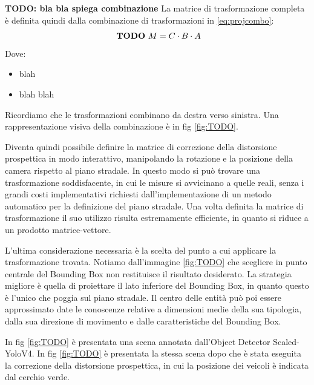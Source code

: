 \textbf{TODO: bla bla spiega combinazione}
La matrice di trasformazione completa è definita quindi dalla combinazione di trasformazioni in \ref{eq:projcombo}:
\begin{equation}
    \label{eq:projcombo}
    \text{ \textbf{TODO}\  }
    M = C \cdot B \cdot A
\end{equation}
Dove:
\begin{itemize}
    \item blah
    \item blah blah
\end{itemize}
Ricordiamo che le trasformazioni combinano da destra verso sinistra.
Una rappresentazione visiva della combinazione è in fig \ref{fig:TODO}.

Diventa quindi possibile definire la matrice di correzione della distorsione prospettica in modo interattivo, manipolando la rotazione e la posizione della camera rispetto al piano stradale.
In questo modo si può trovare una trasformazione soddisfacente, in cui le misure si avvicinano a quelle reali, senza i grandi costi implementativi richiesti dall'implementazione di un metodo automatico per la definizione del piano stradale.
Una volta definita la matrice di trasformazione il suo utilizzo risulta estremamente efficiente, in quanto si riduce a un prodotto matrice-vettore.

L'ultima considerazione necessaria è la scelta del punto a cui applicare la trasformazione trovata.
Notiamo dall'immagine \ref{fig:TODO} che scegliere in punto centrale del Bounding Box non restituisce il risultato desiderato.
La strategia migliore è quella di proiettare il lato inferiore del Bounding Box, in quanto questo è l'unico che poggia sul piano stradale.
Il centro delle entità può poi essere approssimato date le conoscenze relative a dimensioni medie della sua tipologia, dalla sua direzione di movimento e dalle caratteristiche del Bounding Box.

In fig \ref{fig:TODO} è presentata una scena annotata dall'Object Detector Scaled-YoloV4.
In fig \ref{fig:TODO} è presentata la stessa scena dopo che è stata eseguita la correzione della distorsione prospettica, in cui la posizione dei veicoli è indicata dal cerchio verde.
